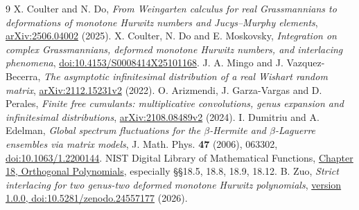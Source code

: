 \documentclass[11pt]{article}
\begin{document}
\begin{thebibliography}{9}
 X. Coulter and N. Do, \emph{From Weingarten calculus for real Grassmannians to deformations of monotone Hurwitz numbers and Jucys--Murphy elements}, \href{https://arxiv.org/abs/2506.04002}{arXiv:2506.04002} (2025).
 X. Coulter, N. Do and E. Moskovsky, \emph{Integration on complex Grassmannians, deformed monotone Hurwitz numbers, and interlacing phenomena}, \href{https://doi.org/10.4153/S0008414X25101168}{doi:10.4153/S0008414X25101168}.
 J. A. Mingo and J. Vazquez-Becerra, \emph{The asymptotic infinitesimal distribution of a real Wishart random matrix}, \href{https://arxiv.org/abs/2112.15231v2}{arXiv:2112.15231v2} (2022).
 O. Arizmendi, J. Garza-Vargas and D. Perales, \emph{Finite free cumulants: multiplicative convolutions, genus expansion and infinitesimal distributions}, \href{https://arxiv.org/abs/2108.08489v2}{arXiv:2108.08489v2} (2024).
 I. Dumitriu and A. Edelman, \emph{Global spectrum fluctuations for the $\beta$-Hermite and $\beta$-Laguerre ensembles via matrix models}, J. Math. Phys. \textbf{47} (2006), 063302, \href{https://doi.org/10.1063/1.2200144}{doi:10.1063/1.2200144}.
 NIST Digital Library of Mathematical Functions, \href{https://dlmf.nist.gov/18}{Chapter 18, Orthogonal Polynomials}, especially \S\S18.5, 18.8, 18.9, 18.12.
 B. Zuo, \emph{Strict interlacing for two genus-two deformed monotone Hurwitz polynomials}, \href{https://doi.org/10.5281/zenodo.24557177}{version 1.0.0, doi:10.5281/zenodo.24557177} (2026).
\end{thebibliography}
\end{document}

